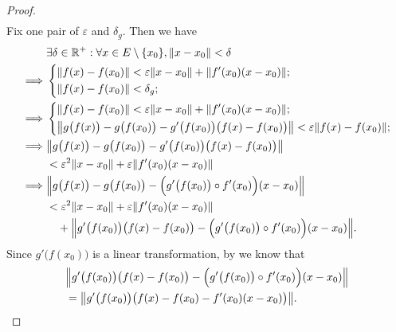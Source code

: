 \begin{proof}
\begin{align*}
  \end{align*}
  Fix one pair of \(\varepsilon\) and \(\delta_g\).
  Then we have
  \begin{align*}
             & \exists \delta \in \R^+ : \forall x \in E \setminus \set{x_0}, \norm*{x - x_0} < \delta                                      \\
    \implies & \begin{dcases}
                 \norm*{f(x) - f(x_0)} < \varepsilon \norm*{x - x_0} + \norm*{f'(x_0)(x - x_0)}; \\
                 \norm*{f(x) - f(x_0)} < \delta_g;
               \end{dcases}                                              \\
    \implies & \begin{dcases}
                 \norm*{f(x) - f(x_0)} < \varepsilon \norm*{x - x_0} + \norm*{f'(x_0)(x - x_0)}; \\
                 \norm*{g\big(f(x)\big) - g\big(f(x_0)\big) - g'\big(f(x_0)\big) \big(f(x) - f(x_0)\big)} < \varepsilon \norm*{f(x) - f(x_0)};
               \end{dcases} \\
    \implies & \norm*{g\big(f(x)\big) - g\big(f(x_0)\big) - g'\big(f(x_0)\big) \big(f(x) - f(x_0)\big)}                                     \\
             & < \varepsilon^2 \norm*{x - x_0} + \varepsilon \norm*{f'(x_0)(x - x_0)}                                                       \\
    \implies & \norm*{g\big(f(x)\big) - g\big(f(x_0)\big) - \Big(g'\big(f(x_0)\big) \circ f'(x_0)\Big) (x - x_0)}                           \\
             & < \varepsilon^2 \norm*{x - x_0} + \varepsilon \norm*{f'(x_0)(x - x_0)}                                                       \\
             & \quad + \norm*{g'\big(f(x_0)\big) \big(f(x) - f(x_0)\big) - \Big(g'\big(f(x_0)\big) \circ f'(x_0)\Big) (x - x_0)}.
  \end{align*}
  Since \(g'\big(f(x_0)\big)\) is a linear transformation, by  we know that
  \begin{align*}
     & \norm*{g'\big(f(x_0)\big) \big(f(x) - f(x_0)\big) - \Big(g'\big(f(x_0)\big) \circ f'(x_0)\Big) (x - x_0)} \\
     & = \norm*{g'\big(f(x_0)\big) \big(f(x) - f(x_0) - f'(x_0) (x - x_0)\big)}.
  \end{align*}

\end{proof}
